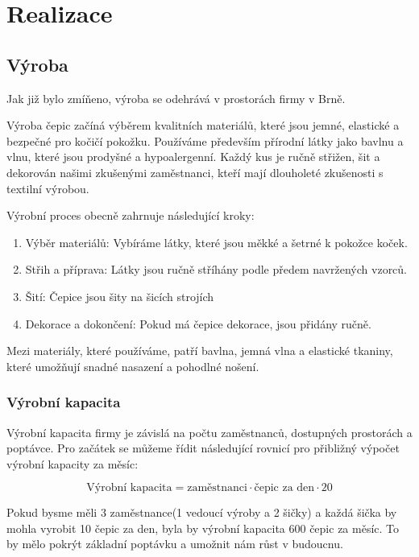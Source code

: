 \documentclass[12pt, a4paper]{article}
\begin{document}
\section{Realizace}
\subsection{Výroba}

Jak již bylo zmíňeno, výroba se odehrává v prostorách firmy v Brně. 
\vspace{10pt}

Výroba čepic začíná výběrem kvalitních materiálů, které jsou jemné, elastické a bezpečné pro kočičí pokožku.
Používáme především přírodní látky jako bavlnu a vlnu, které jsou prodyšné a hypoalergenní.
Každý kus je ručně střižen, šit a dekorován našimi zkušenými zaměstnanci, kteří mají dlouholeté zkušenosti s textilní výrobou.

Výrobní proces obecně zahrnuje následující kroky:

\begin{enumerate}
  \item Výběr materiálů: Vybíráme látky, které jsou měkké a šetrné k pokožce koček.
  \item Střih a příprava: Látky jsou ručně stříhány podle předem navržených vzorců.
  \item Šití: Čepice jsou šity na šicích strojích
  \item Dekorace a dokončení: Pokud má čepice dekorace, jsou přidány ručně.
\end{enumerate}

Mezi materiály, které používáme, patří bavlna, jemná vlna a elastické tkaniny, které umožňují snadné nasazení a pohodlné nošení.

\subsubsection{Výrobní kapacita}

Výrobní kapacita firmy je závislá na počtu zaměstnanců, dostupných prostorách a poptávce.
Pro začátek se můžeme řídit následující rovnicí pro přibližný výpočet výrobní kapacity za měsíc:

\begin{equation}
  \text{Výrobní kapacita} = \text{zaměstnanci} \cdot \text{čepic za den} \cdot 20
\end{equation}

Pokud bysme měli 3 zaměstnance(1 vedoucí výroby a 2 šičky) a každá šička by mohla vyrobit 10 čepic za den, byla by výrobní kapacita 600 čepic za měsíc.
To by mělo pokrýt základní poptávku a umožnit nám růst v budoucnu.
\end{document}
